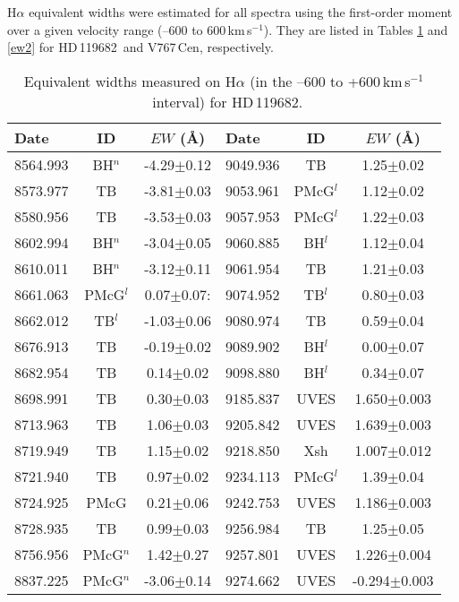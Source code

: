 \documentclass[a4paper,fleqn,usenatbib]{mnras}
\newcommand{\hd}{HD\,119682}
\newcommand{\vc}{V767\,Cen}
\newcommand{\kms}{km\,s$^{-1}$}
\begin{document}
H$\alpha$ equivalent widths were estimated for all spectra using the first-order moment over a given velocity range (--600 to 600\,\kms). They are listed in Tables \ref{ew} and \ref{ew2} for \hd\ and \vc, respectively.

\begin{table}
  \caption{Equivalent widths measured on H$\alpha$ (in the --600 to +600\,\kms\ interval) for \hd.  \label{ew}}
\setlength{\tabcolsep}{3.3pt}
  \begin{tabular}{lcc|lcc}
    \hline
Date & ID & $EW$ (\AA) & Date & ID & $EW$ (\AA) \\
        \hline
8564.993 &BH$^n$  &   -4.29$\pm$0.12 & 9049.936 &TB      &    1.25$\pm$0.02 \\ 
8573.977 &TB      &   -3.81$\pm$0.03 & 9053.961 &PMcG$^l$&    1.12$\pm$0.02 \\ 
8580.956 &TB      &   -3.53$\pm$0.03 & 9057.953 &PMcG$^l$&    1.22$\pm$0.03 \\ 
8602.994 &BH$^n$  &   -3.04$\pm$0.05 & 9060.885 &BH$^l$  &    1.12$\pm$0.04 \\ 
8610.011 &BH$^n$  &   -3.12$\pm$0.11 & 9061.954 &TB      &    1.21$\pm$0.03 \\ 
8661.063 &PMcG$^l$&    0.07$\pm$0.07: & 9074.952 &TB$^l$  &    0.80$\pm$0.03 \\ 
8662.012 &TB$^l$  &   -1.03$\pm$0.06 & 9080.974 &TB      &    0.59$\pm$0.04 \\ 
8676.913 &TB      &   -0.19$\pm$0.02 & 9089.902 &BH$^l$  &    0.00$\pm$0.07 \\ 
8682.954 &TB      &    0.14$\pm$0.02 & 9098.880 &BH$^l$  &    0.34$\pm$0.07 \\ 
8698.991 &TB      &    0.30$\pm$0.03 & 9185.837 &UVES    &   1.650$\pm$0.003 \\
8713.963 &TB      &    1.06$\pm$0.03 & 9205.842 &UVES    &   1.639$\pm$0.003 \\
8719.949 &TB      &    1.15$\pm$0.02 & 9218.850 &Xsh     &   1.007$\pm$0.012 \\
8721.940 &TB      &    0.97$\pm$0.02 & 9234.113 &PMcG$^l$&    1.39$\pm$0.04  \\
8724.925 &PMcG    &    0.21$\pm$0.06 & 9242.753 &UVES    &   1.186$\pm$0.003 \\
8728.935 &TB      &    0.99$\pm$0.03 & 9256.984 &TB      &    1.25$\pm$0.05  \\
8756.956 &PMcG$^n$&    1.42$\pm$0.27 & 9257.801 &UVES    &   1.226$\pm$0.004 \\ 
8837.225 &PMcG$^n$&   -3.06$\pm$0.14 & 9274.662 &UVES    &  -0.294$\pm$0.003 \\ 

\end{tabular}
\end{table}
\end{document}
